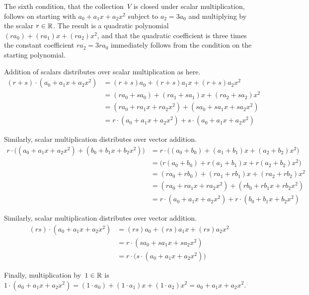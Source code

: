 \documentclass[answers]{examjh}
\begin{document}
\begin{questions}
\begin{solution}
The sixth condition, 
that the collection~$V$ is closed under scalar multiplication,
follows on starting with $a_0+a_1x+a_2x^2$ subject to $a_2=3a_0$ and
multiplying by the scalar $r\in\mathbb{R}$.
The result is a quadratic polynomial $(ra_0)+(ra_1)x+(ra_2)x^2$, and that
the quadratic coefficient is three times the constant coefficient
$ra_2=3ra_0$ immediately follows from the condition on the starting
polynomial.

Addition of scalars distributes over scalar multiplication as here.
\begin{align*}
  (r+s)\cdot(a_0+a_1x+a_2x^2)
    &=(r+s)a_0+(r+s)a_1x+(r+s)a_2x^2             \\
    &=(ra_0+sa_0)+(ra_1+sa_1)x+(ra_2+sa_2)x^2     \\
    &=(ra_0+ra_1x+ra_2x^2)+(sa_0+sa_1x+sa_2x^2)  \\
    &=r\cdot(a_0+a_1x+a_2x^2)+s\cdot(a_0+a_1x+a_2x^2)
\end{align*}

Similarly, scalar multiplication distributes over vector addition.
\begin{align*}
  r\cdot\big((a_0+a_1x+a_2x^2)+(b_0+b_1x+b_2x^2)\big)
    &=r\cdot \big((a_0+b_0)+(a_1+b_1)x+(a_2+b_2)x^2\big)   \\
    &=\big(r(a_0+b_0)+r(a_1+b_1)x+r(a_2+b_2)x^2\big)   \\
    &=(ra_0+rb_0)+(ra_1+rb_1)x+(ra_2+rb_2)x^2     \\
    &=(ra_0+ra_1x+ra_2x^2)+(rb_0+rb_1x+rb_2x^2)  \\
    &=r\cdot(a_0+a_1x+a_2x^2)+r\cdot(b_0+b_1x+b_2x^2)
\end{align*}

Similarly, scalar multiplication distributes over vector addition.
\begin{align*}
  (rs)\cdot(a_0+a_1x+a_2x^2)
    &=(rs)a_0+(rs)a_1x+(rs)a_2x^2          \\
    &=r\cdot (sa_0+sa_1x+sa_2x^2)   \\
    &=r\cdot\big( s\cdot (a_0+a_1x+a_2x^2) \big) 
\end{align*}

Finally, multiplication by~$1\in\mathbb{R}$ is
$1\cdot(a_0+a_1x+a_2x^2)=(1\cdot a_0)+(1\cdot a_1)x+(1\cdot a_2)x^2
=a_0+a_1x+a_2x^2$.
\end{solution}
\end{questions}
\end{document}
